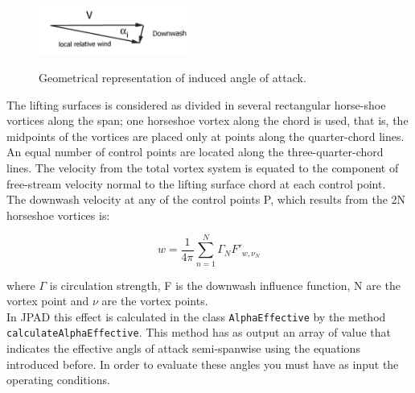 \begin{figure}[H]
\centering
{\includegraphics[height=1.6cm]{Immagini/atg}} 
\caption{Geometrical representation of induced angle of attack.}
\end{figure}

The lifting surfaces is considered as divided in several rectangular horse-shoe vortices along the span; one horseshoe vortex along the chord is used, that is, the midpoints of the vortices are placed only at points along the quarter-chord lines. An equal number of control points are located along the three-quarter-chord lines. The velocity from the total vortex system is equated to the component of free-stream velocity normal to the lifting surface chord at each control point.\\
The downwash velocity at any of the control points P, which results from the 2N horseshoe vortices is:

\begin{equation}
w = \frac{1}{4\pi} \sum_{n=1}^N \Gamma_N F'_{w,\nu_N}
\end{equation}

where $\Gamma$ is circulation strength, F is the downwash influence function, N are the vortex point and $\nu$ are the vortex points.\\
In JPAD this effect is calculated in the class \texttt{AlphaEffective} by the method \texttt{calculateAlphaEffective}. This method has as output an array of value that indicates the effective angls of attack semi-spanwise using the equations introduced before. In order to evaluate these angles you must have as input the operating conditions. 

